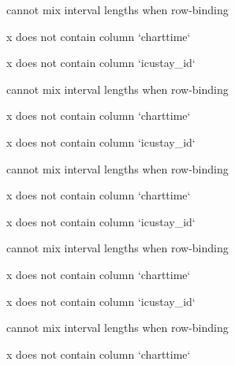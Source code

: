 \documentclass[
]{jss}
\begin{document}
\begin{CodeChunk}
\begin{CodeOutput}
cannot mix interval lengths when row-binding
\end{CodeOutput}

\begin{CodeOutput}
x does not contain column `charttime`
\end{CodeOutput}

\begin{CodeOutput}
x does not contain column `icustay_id`
\end{CodeOutput}

\begin{CodeOutput}
cannot mix interval lengths when row-binding
\end{CodeOutput}

\begin{CodeOutput}
x does not contain column `charttime`
\end{CodeOutput}

\begin{CodeOutput}
x does not contain column `icustay_id`
\end{CodeOutput}

\begin{CodeOutput}
cannot mix interval lengths when row-binding
\end{CodeOutput}

\begin{CodeOutput}
x does not contain column `charttime`
\end{CodeOutput}

\begin{CodeOutput}
x does not contain column `icustay_id`
\end{CodeOutput}

\begin{CodeOutput}
cannot mix interval lengths when row-binding
\end{CodeOutput}

\begin{CodeOutput}
x does not contain column `charttime`
\end{CodeOutput}

\begin{CodeOutput}
x does not contain column `icustay_id`
\end{CodeOutput}

\begin{CodeOutput}
cannot mix interval lengths when row-binding
\end{CodeOutput}

\begin{CodeOutput}
x does not contain column `charttime`
\end{CodeOutput}


\end{CodeChunk}
\end{document}
